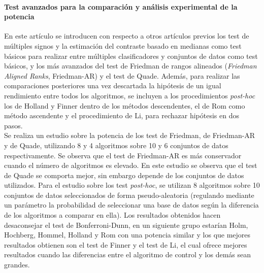	\paragraph{Test avanzados para la comparación y análisis 
experimental de la potencia} \cite{DBLP:journals/isci/GarciaFLH10} En este
artículo se introducen con respecto a otros artículos 
previos los test de múltiples signos y la estimación del 
contraste basado en medianas como test básicos para realizar
entre múltiples clasificadores y conjuntos de datos como 
test básicos, y los más avanzados del test de Friedman
de rangos alineados (\textit{Friedman Aligned Ranks}, 
Friedman-AR) y el test de Quade. Además, para realizar las 
comparaciones  posteriores  una vez descartada la hipótesis 
de un igual  rendimiento entre todos los algoritmos, se 
incluyen a los  procedimientos \textit{post-hoc} los de 
Holland y Finner  dentro de  los métodos descendentes, el de 
Rom como método  ascendente y el procedimiento de Li, para 
rechazar hipótesis en dos pasos.\\
	Se realiza un estudio sobre la potencia de los test
de Friedman, de Friedman-AR y de Quade, utilizando 8 y 4
algoritmos sobre 10 y 6 conjuntos de datos respectivamente. 
Se observa que el test de Friedman-AR es más conservador
cuando el número de algoritmos es elevado. En este estudio
se observa que el test de Quade se comporta mejor, sin
embargo depende de los conjuntos de datos utilizados. Para
el estudio sobre los test \textit{post-hoc}, se utilizan
8 algoritmos sobre 10 conjuntos de datos seleccionados
de forma pseudo-aleatoria (regulando mediante un parámetro la 
probabilidad de seleccionar una base de datos según la 
diferencia de los algoritmos a comparar en ella). Los 
resultados obtenidos hacen desaconsejar el test de 
Bonferroni-Dunn, en un siguiente grupo estarían Holm, 
Hochberg, Hommel, Holland y Rom con una potencia similar
y los que mejores resultados obtienen son el test de Finner
y el test de Li, el cual ofrece mejores resultados 
cuando las diferencias entre el algoritmo de control y los 
demás sean grandes.

	
